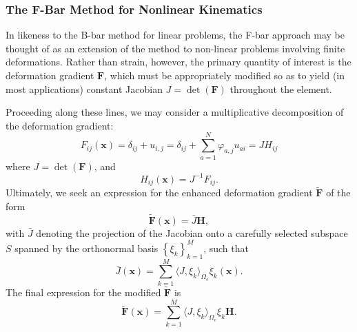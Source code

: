 \documentclass[12pt]{book}
\begin{document}
\subsubsection{The F-Bar Method for Nonlinear Kinematics}

In likeness to the B-bar method for linear problems, the F-bar approach may be thought of as an extension of the method to non-linear problems involving finite deformations. Rather than strain, however, the primary quantity of interest is the deformation gradient $\mathbf{F}$, which must be appropriately modified so as to yield (in most applications) constant Jacobian $J = \det (\mathbf{F})$ throughout the element.

Proceeding along these lines, we may consider a multiplicative decomposition of the deformation gradient:
\begin{equation}
  F_{ij} (\mathbf{x}) = \delta_{ij} + u_{i,j} = \delta_{ij} + \sum_{a=1}^N \varphi_{a,j} u_{ai} = J H_{ij}
\end{equation}
where $J = \det (\mathbf{F})$, and
\begin{equation}
  H_{ij} (\mathbf{x}) = J^{-1} F_{ij}.
\end{equation}
Ultimately, we seek an expression for the enhanced deformation gradient $\tilde{\mathbf{F}}$ of the form
\begin{equation}
  \tilde{\mathbf{F}} (\mathbf{x}) = \bar{J} \mathbf{H},
\end{equation}
with $\bar{J}$ denoting the projection of the Jacobian onto a carefully selected subspace $S$ spanned by the orthonormal basis $\left\{ \xi_k \right\}_{k = 1}^M$, such that
\begin{equation}
  \bar{J} (\mathbf{x}) = \sum_{k=1}^M \langle J, \xi_k \rangle_{\Omega_e} \xi_k (\mathbf{x}).
\end{equation}
The final expression for the modified $\tilde{\mathbf{F}}$ is
\begin{equation}
  \tilde{\mathbf{F}} (\mathbf{x}) = \sum_{k=1}^M \langle J, \xi_k \rangle_{\Omega_e} \xi_k \mathbf{H}.
\end{equation}
\end{document}
